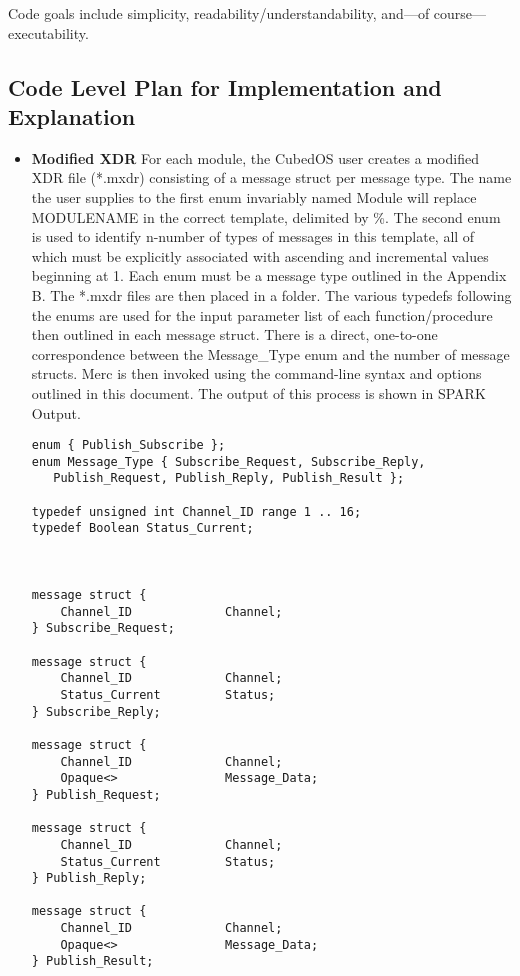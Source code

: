 Code goals include simplicity, readability/understandability, and—of course—executability.

\subsection{Code Level Plan for Implementation and Explanation}

\begin{itemize}
\item \textbf{Modified XDR} For each module, the CubedOS user creates a modified XDR file
  (*.mxdr) consisting of a message struct per message type. The name the user supplies to the
  first enum invariably named Module will replace MODULENAME in the correct template, delimited
  by \%. The second enum is used to identify n-number of types of messages in this template, all
  of which must be explicitly associated with ascending and incremental values beginning at 1.
  Each enum must be a message type outlined in the Appendix B. The *.mxdr files are then placed
  in a folder. The various typedefs following the enums are used for the input parameter list of
  each function/procedure then outlined in each message struct. There is a direct, one-to-one
  correspondence between the Message\_Type enum and the number of message structs. Merc is
  then invoked using the command-line syntax and options outlined in this document. The output
  of this process is shown in SPARK Output.
\begin{verbatim}
enum { Publish_Subscribe };
enum Message_Type { Subscribe_Request, Subscribe_Reply, 
   Publish_Request, Publish_Reply, Publish_Result };

typedef unsigned int Channel_ID range 1 .. 16;
typedef Boolean Status_Current;



message struct {
    Channel_ID             Channel;
} Subscribe_Request;

message struct {
    Channel_ID             Channel;
    Status_Current         Status;
} Subscribe_Reply;

message struct {
    Channel_ID             Channel;
    Opaque<>               Message_Data;
} Publish_Request;

message struct {
    Channel_ID             Channel;
    Status_Current         Status;
} Publish_Reply;

message struct {
    Channel_ID             Channel;
    Opaque<>               Message_Data;
} Publish_Result;
\end{verbatim}
  

\end{itemize}
